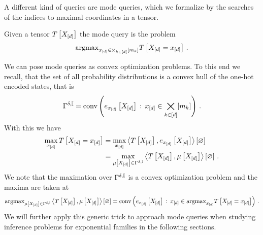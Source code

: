 \label{sec:modeQueries}

A different kind of queries are mode queries, which we formalize by the searches of the indices to maximal coordinates in a tensor.

\begin{definition}
    Given a tensor $T\left[X_{[d]}\right]$ the mode query is the problem
    \begin{align}
        \mathrm{argmax}_{x_{[d]}\in\bigtimes_{k\in[d]}[m_{k}]} T\left[X_{[d]}=x_{[d]}\right] \, .
    \end{align}
\end{definition}


We can pose mode queries as convex optimization problems.
To this end we recall, that the set of all probability distributions is a convex hull of the one-hot encoded states, that is
\begin{align*}
    \Gamma^{\delta,\mathbb{I}}
    = \mathrm{conv}\left(e_{x_{[d]}}\left[X_{[d]}\right] \, : \, x_{[d]}\in\bigtimes_{k\in[d]}[m_{k}]\right) \, .
\end{align*}
With this we have
\begin{align*}
    \max_{x_{[d]}} T\left[X_{[d]}=x_{[d]}\right]
    &= \max_{x_{[d]}} \left\langle T\left[X_{[d]}\right],e_{x_{[d]}}\left[X_{[d]}\right]\right\rangle \left[ \varnothing \right] \\
    &= \max_{\mu\left[X_{[d]}\right]\in\Gamma^{\delta,\mathbb{I}}} \left\langle T\left[X_{[d]}\right],\mu\left[X_{[d]}\right]\right\rangle \left[ \varnothing \right] \, .
\end{align*}
We note that the maximation over $\Gamma^{\delta,\mathbb{I}}$ is a convex optimization problem and the maxima are taken at
\begin{align*}
    \mathrm{argmax}_{\mu\left[X_{[d]}\right]\in\Gamma^{\delta,\mathbb{I}}} \left\langle T\left[X_{[d]}\right],\mu\left[X_{[d]}\right]\right\rangle \left[ \varnothing \right]
    = \mathrm{conv}\left(e_{x_{[d]}}\left[X_{[d]}\right] \, : \, x_{[d]}\in\mathrm{argmax}_{x_{[d]}} T\left[X_{[d]}=x_{[d]}\right]\right) \, .
\end{align*}
We will further apply this generic trick to approach mode queries when studying inference problems for exponential families in the following sections.

